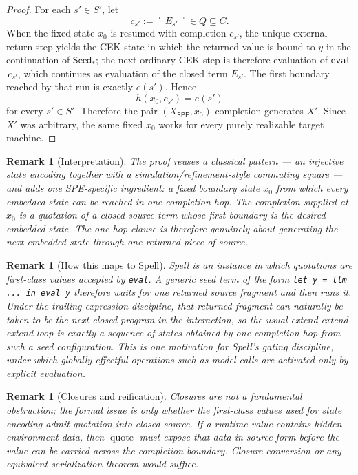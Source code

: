 \documentclass[11pt]{article}
\newtheorem{remark}[definition]{Remark}
\newcommand{\SPE}{\mathsf{SPE}}
\newcommand{\quoteop}{\operatorname{quote}}
\begin{document}
\begin{proof}
For each $s'\in S'$, let
\[
c_{s'}:=\ulcorner E_{s'}\urcorner\in Q\subseteq C.
\]
When the fixed state $x_0$ is resumed with completion $c_{s'}$, the unique external return step yields the CEK state in which the returned value is bound to $y$ in the continuation of $\mathsf{Seed}_{\ast}$; the next ordinary CEK step is therefore evaluation of \texttt{eval} $\,c_{s'}$, which continues as evaluation of the closed term $E_{s'}$. The first boundary reached by that run is exactly $e(s')$. Hence
\[
h(x_0,c_{s'})=e(s')
\]
for every $s'\in S'$. Therefore the pair $(X_{\SPE},x_0)$ completion-generates $X'$. Since $X'$ was arbitrary, the same fixed $x_0$ works for every purely realizable target machine.
\end{proof}

\begin{remark}[Interpretation]
The proof reuses a classical pattern --- an injective state encoding together with a simulation/refinement-style commuting square \cite{AbadiLamport91,LynchVaandrager95,SegalaLynch95} --- and adds one SPE-specific ingredient: a fixed boundary state $x_0$ from which every embedded state can be reached in one completion hop. The completion supplied at $x_0$ is a quotation of a closed source term whose first boundary is the desired embedded state. The one-hop clause is therefore genuinely about generating the next embedded state through one returned piece of source.
\end{remark}

\begin{remark}[How this maps to Spell]
Spell is an instance in which quotations are first-class values accepted by \texttt{eval}. A generic seed term of the form \texttt{let y = llm ... in eval y} therefore waits for one returned source fragment and then runs it. Under the trailing-expression discipline, that returned fragment can naturally be taken to be the next closed program in the interaction, so the usual extend-extend-extend loop is exactly a sequence of states obtained by one completion hop from such a seed configuration. This is one motivation for Spell's gating discipline, under which globally effectful operations such as model calls are activated only by explicit evaluation.
\end{remark}

\begin{remark}[Closures and reification]
Closures are not a fundamental obstruction; the formal issue is only whether the first-class values used for state encoding admit quotation into closed source. If a runtime value contains hidden environment data, then $\quoteop$ must expose that data in source form before the value can be carried across the completion boundary. Closure conversion or any equivalent serialization theorem would suffice.
\end{remark}
\end{document}
